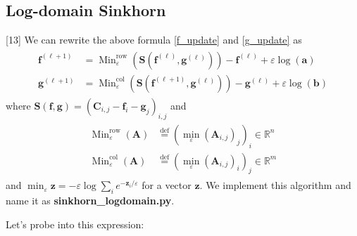 \documentclass{article}
\begin{document}
\begin{large}
\subsection{Log-domain Sinkhorn}
[13] We can rewrite the above formula \ref{f_update} and \ref{g_update} as
\begin{align}
\begin{aligned} \mathbf { f } ^ { ( \ell + 1 ) } & = \operatorname { Min } _ { \varepsilon } ^ { \mathrm { row } } \left( \mathbf { S } \left( \mathbf { f } ^ { ( \ell ) } , \mathbf { g } ^ { ( \ell ) } \right) \right) - \mathbf { f } ^ { ( \ell ) } + \varepsilon \log ( \mathbf { a } ) \\ \mathbf { g } ^ { ( \ell + 1 ) } & = \operatorname { Min } _ { \varepsilon } ^ { \mathrm { col } } \left( \mathbf { S } \left( \mathbf { f } ^ { ( \ell + 1 ) } , \mathbf { g } ^ { ( \ell ) } \right) \right) - \mathbf { g } ^ { ( \ell ) } + \varepsilon \log ( \mathbf { b } ) \end{aligned}
\label{log update}
\end{align}
where $\mathbf { S } ( \mathbf { f } , \mathbf { g } ) = \left( \mathbf { C } _ { i , j } - \mathbf { f } _ { i } - \mathbf { g } _ { j } \right) _ { i , j }$ and
\begin{align}
\begin{aligned} \operatorname { Min } _ { \varepsilon } ^ { \mathrm { row } } ( \mathbf { A } ) &\stackrel { \mathrm { def } } { = } \left( \min _ { \varepsilon } \left( \mathbf { A } _ { i , j } \right) _ { j } \right) _ { i }  \in \mathbb { R } ^ { n } \\ \operatorname { Min } _ { \varepsilon } ^ { \mathrm { col } } ( \mathbf { A } ) &\stackrel { \mathrm { def} } { = }  \left( \min _ { \varepsilon } \left( \mathbf { A } _ { i , j } \right) _ { i } \right) _ { j } \in \mathbb { R } ^ { m } \end{aligned}
\end{align}
and $\min _ { \varepsilon } \mathbf { z } = - \varepsilon \log \sum _ { i } e ^ { - \mathbf { z } _ { i } / \varepsilon }$ for a vector $\mathbf{z}$.
We implement this algorithm and name it as \textbf{sinkhorn\_logdomain.py}.

Let's probe into this expression:


\end{large}
\end{document}
